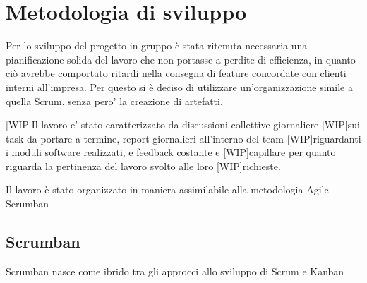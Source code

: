 \chapter{Metodologia di sviluppo}
\label{ch:metodologia}
Per lo sviluppo del progetto in gruppo è stata ritenuta necessaria una pianificazione solida del lavoro che non portasse a perdite di efficienza, in quanto ciò avrebbe comportato ritardi nella consegna di feature concordate con clienti interni all'impresa.
Per questo si è deciso di utilizzare un'organizzazione simile a quella Scrum, senza pero' la creazione di artefatti.

[WIP]Il lavoro e' stato caratterizzato da discussioni collettive giornaliere [WIP]sui task da portare a termine, report giornalieri all'interno del team [WIP]riguardanti i moduli software realizzati, e feedback costante e [WIP]capillare per quanto riguarda la pertinenza del lavoro svolto alle loro [WIP]richieste.

Il lavoro è stato organizzato in maniera assimilabile alla metodologia Agile Scrumban
\section{Scrumban}
Scrumban nasce come ibrido tra gli approcci allo sviluppo di Scrum e Kanban

